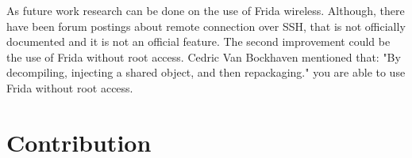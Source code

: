 \documentclass[12pt, a4paper]{report}
\begin{document}
As future work research can be done on the use of Frida wireless. Although, there have been forum postings about remote connection over SSH, that is not officially documented and it is not an official feature.
\newline
\newline
The second improvement could be the use of Frida without root access. Cedric Van Bockhaven mentioned that: "By decompiling, injecting a shared object, and then repackaging." you are able to use Frida without root access.

\chapter{Contribution} 



\end{document}
